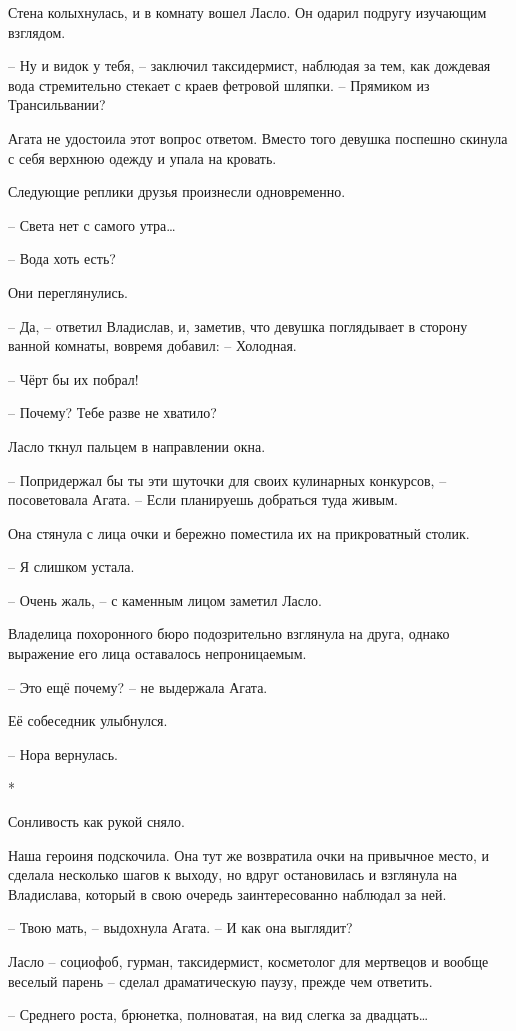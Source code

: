 \documentclass[
  a5paperpaper,
  DIV=11,
  numbers=noendperiod]{scrreprt}
\begin{document}
Стена колыхнулась, и в комнату вошел Ласло. Он одарил подругу изучающим
взглядом.

-- Ну и видок у тебя, -- заключил таксидермист, наблюдая за тем, как
дождевая вода стремительно стекает с краев фетровой шляпки. -- Прямиком
из Трансильвании?

Агата не удостоила этот вопрос ответом. Вместо того девушка поспешно
скинула с себя верхнюю одежду и упала на кровать.

Следующие реплики друзья произнесли одновременно.

-- Света нет с самого утра\ldots{}

-- Вода хоть есть?

Они переглянулись.

-- Да, -- ответил Владислав, и, заметив, что девушка поглядывает в
сторону ванной комнаты, вовремя добавил: -- Холодная.

-- Чёрт бы их побрал!

-- Почему? Тебе разве не хватило?

Ласло ткнул пальцем в направлении окна.

-- Попридержал бы ты эти шуточки для своих кулинарных конкурсов, --
посоветовала Агата. -- Если планируешь добраться туда живым.

Она стянула с лица очки и бережно поместила их на прикроватный столик.

-- Я слишком устала.

-- Очень жаль, -- с каменным лицом заметил Ласло.

Владелица похоронного бюро подозрительно взглянула на друга, однако
выражение его лица оставалось непроницаемым.

-- Это ещё почему? -- не выдержала Агата.

Её собеседник улыбнулся.

-- Нора вернулась.

*

Сонливость как рукой сняло.

Наша героиня подскочила. Она тут же возвратила очки на привычное место,
и сделала несколько шагов к выходу, но вдруг остановилась и взглянула на
Владислава, который в свою очередь заинтересованно наблюдал за ней.

-- Твою мать, -- выдохнула Агата. -- И как она выглядит?

Ласло -- социофоб, гурман, таксидермист, косметолог для мертвецов и
вообще веселый парень -- сделал драматическую паузу, прежде чем
ответить.

-- Среднего роста, брюнетка, полноватая, на вид слегка за
двадцать\ldots{}
\end{document}

